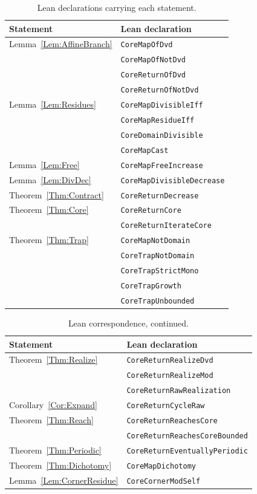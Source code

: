 \documentclass[11pt,letterpaper]{article}
\begin{document}
\begin{table}[htbp]
\centering
\begin{tabular}{ll}
\toprule
Statement & Lean declaration \\
\midrule
Lemma~\ref{Lem:AffineBranch} & \texttt{CoreMapOfDvd} \\
 & \texttt{CoreMapOfNotDvd} \\
 & \texttt{CoreReturnOfDvd} \\
 & \texttt{CoreReturnOfNotDvd} \\
Lemma~\ref{Lem:Residues} & \texttt{CoreMapDivisibleIff} \\
 & \texttt{CoreMapResidueIff} \\
 & \texttt{CoreDomainDivisible} \\
 & \texttt{CoreMapCast} \\
Lemma~\ref{Lem:Free} & \texttt{CoreMapFreeIncrease} \\
Lemma~\ref{Lem:DivDec} & \texttt{CoreMapDivisibleDecrease} \\
Theorem~\ref{Thm:Contract} & \texttt{CoreReturnDecrease} \\
Theorem~\ref{Thm:Core} & \texttt{CoreReturnCore} \\
 & \texttt{CoreReturnIterateCore} \\
Theorem~\ref{Thm:Trap} & \texttt{CoreMapNotDomain} \\
 & \texttt{CoreTrapNotDomain} \\
 & \texttt{CoreTrapStrictMono} \\
 & \texttt{CoreTrapGrowth} \\
 & \texttt{CoreTrapUnbounded} \\
\bottomrule
\end{tabular}
\caption{Lean declarations carrying each statement.}
\end{table}

\begin{table}[htbp]
\centering
\begin{tabular}{ll}
\toprule
Statement & Lean declaration \\
\midrule
Theorem~\ref{Thm:Realize} & \texttt{CoreReturnRealizeDvd} \\
 & \texttt{CoreReturnRealizeMod} \\
 & \texttt{CoreReturnRawRealization} \\
Corollary~\ref{Cor:Expand} & \texttt{CoreReturnCycleRaw} \\
Theorem~\ref{Thm:Reach} & \texttt{CoreReturnReachesCore} \\
 & \texttt{CoreReturnReachesCoreBounded} \\
Theorem~\ref{Thm:Periodic} & \texttt{CoreReturnEventuallyPeriodic} \\
Theorem~\ref{Thm:Dichotomy} & \texttt{CoreMapDichotomy} \\
Lemma~\ref{Lem:CornerResidue} & \texttt{CoreCornerModSelf} \\
\bottomrule
\end{tabular}
\caption{Lean correspondence, continued.}
\end{table}
\end{document}
